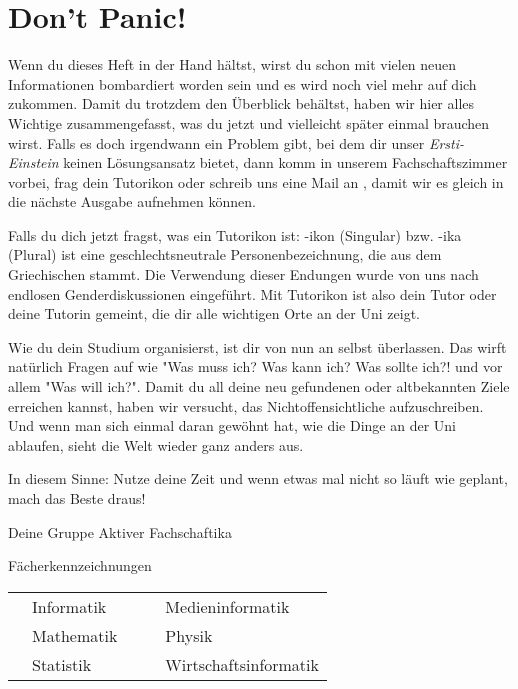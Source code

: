 %
%

\chapter{Don't Panic!}

Wenn du dieses Heft in der Hand hältst, wirst du schon mit vielen neuen Informationen bombardiert worden sein und es wird noch viel mehr auf dich zukommen. Damit du trotzdem den Überblick behältst, haben wir hier alles Wichtige zusammengefasst, was du jetzt und vielleicht später einmal brauchen wirst. Falls es doch irgendwann ein Problem gibt, bei dem dir unser \emph{Ersti-Einstein} keinen Lösungsansatz bietet, dann komm in unserem Fachschaftszimmer vorbei, frag dein Tutorikon oder schreib uns eine Mail an , damit wir es gleich in die nächste Ausgabe aufnehmen können. 

Falls du dich jetzt fragst, was ein Tutorikon ist: -ikon (Singular) bzw. -ika (Plural) ist eine geschlechtsneutrale Personenbezeichnung, die aus dem Griechischen stammt. Die Verwendung dieser Endungen wurde von uns nach endlosen Genderdiskussionen eingeführt. Mit Tutorikon ist also dein Tutor oder deine Tutorin gemeint, die dir alle wichtigen Orte an der Uni zeigt.

Wie du dein Studium organisierst, ist dir von nun an selbst überlassen. Das wirft natürlich Fragen auf wie "Was muss ich? Was kann ich? Was sollte ich?! und vor allem "Was will ich?". Damit du all deine neu gefundenen oder altbekannten Ziele erreichen kannst, haben wir versucht, das Nichtoffensichtliche aufzuschreiben. Und wenn man sich einmal daran gewöhnt hat, wie die Dinge an der Uni ablaufen, sieht die Welt wieder ganz anders aus.

In diesem Sinne: Nutze deine Zeit und wenn etwas mal nicht so läuft wie geplant, mach das Beste draus!

Deine Gruppe Aktiver Fachschaftika
\vfill

\begin{table*}
	\centering
	  Fächerkennzeichnungen
		\begin{tabular}{ l l c l l }
			\subjectI & Informatik &  & \subjectMI & Medieninformatik \\
			\subjectM & Mathematik &  & \subjectP  & Physik \\
			\subjectS & Statistik  &  & \subjectW  & Wirtschaftsinformatik \\
		\end{tabular}
\end{table*}


